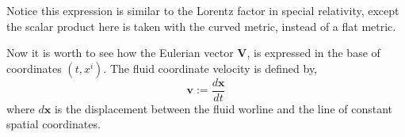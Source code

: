 Notice this expression is similar to the Lorentz factor in special relativity, except the scalar product here is taken with the curved metric, instead of a flat metric.

Now it is worth to see how the Eulerian vector $\mathbf{V}$, is expressed in the base of coordinates $(t,x^i)$. 
The fluid coordinate velocity is defined by,
\begin{equation}
    \mathbf{v}:= \frac{d\mathbf{x}}{dt}
    \label{fig:definition_fluid_coordinate_velocity}
\end{equation}
where $d\mathbf{x}$ is the displacement between the fluid worline and the line of constant spatial coordinates.

\begin{figure}[h]
    \centering
    \begin{center}

\begin{tikzpicture}[x=0.75pt,y=0.75pt,yscale=-1,xscale=1]


\end{tikzpicture}
\end{center}
\end{figure}
